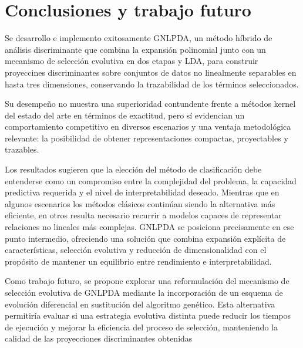 
\chapter{Conclusiones y trabajo futuro}

\label{chap:Conclusiones}

Se desarrollo e implemento exitosamente GNLPDA, un método híbrido de análisis discriminante que combina la expansión polinomial junto con un mecanismo de selección evolutiva en dos etapas y LDA, para construir proyeccines discriminantes sobre conjuntos de datos no linealmente separables en hasta tres dimensiones, conservando la trazabilidad de los términos seleccionados.

Su desempeño no muestra una superioridad contundente frente a métodos kernel del estado del arte en términos de exactitud, pero sí evidencian un comportamiento competitivo en diversos escenarios y una ventaja metodológica relevante: la posibilidad de obtener representaciones compactas, proyectables y trazables.

Los resultados sugieren que la elección del método de clasificación debe entenderse como un compromiso entre la complejidad del problema, la capacidad predictiva requerida y el nivel de interpretabilidad deseado. Mientras que en algunos escenarios los métodos clásicos continúan siendo la alternativa más eficiente, en otros resulta necesario recurrir a modelos capaces de representar relaciones no lineales más complejas. GNLPDA se posiciona precisamente en ese punto intermedio, ofreciendo una solución que combina expansión explícita de características, selección evolutiva y reducción de dimensionalidad con el propósito de mantener un equilibrio entre rendimiento e interpretabilidad.

Como trabajo futuro, se propone explorar una reformulación del mecanismo de selección evolutiva de GNLPDA mediante la incorporación de un esquema de evolución diferencial en sustitución del algoritmo genético. Esta alternativa permitiría evaluar si una estrategia evolutiva distinta puede reducir los tiempos de ejecución y mejorar la eficiencia del proceso de selección, manteniendo la calidad de las proyecciones discriminantes obtenidas






